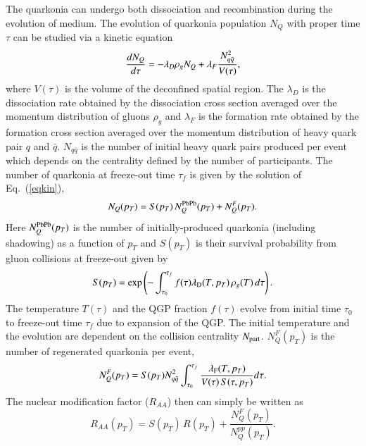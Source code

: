 {\color{black}
  The quarkonia can undergo both dissociation and recombination during the
  evolution of medium.
 The evolution of quarkonia population $N_{Q}$ with proper time $\tau$ can be studied via
a kinetic equation~\cite{Thews:2000rj}
  \begin{equation}\label{eqkin}
    {dN_{Q} \over d\tau}  =  - \lambda_D  \rho_g N_{Q} + \lambda_F {N_{q \bar{q}}^{2} \over V(\tau)},
  \end{equation}
  where $V(\tau)$ is the volume of the deconfined spatial region.
  The $\lambda_{D}$ is the dissociation rate obtained by the dissociation cross section
averaged over the momentum distribution of gluons $\rho_g$ and $\lambda_{F}$ is the formation
rate obtained by the formation cross section 
averaged over the momentum distribution of heavy quark pair $q$ and $\bar{q}$. 
$N_{q \bar{q}}$ is the number of initial heavy quark pairs produced per event which depends
on the centrality defined by the number of participants.
  The number of quarkonia at freeze-out time $\tau_f$ is given by the solution of Eq.~(\ref{eqkin}),
  \begin{equation}
    N_{Q}(p_T) = S(p_T) \,N_{Q}^{\rm PbPb}(p_T)+N_{Q}^F(p_T).
    \label{eqbeta}
  \end{equation}
  Here $N_{Q}^{\rm PbPb}(p_T)$ is the number of initially-produced quarkonia (including shadowing)
  as a function of $p_T$ and $S(p_T)$ is their survival probability from gluon collisions at
  freeze-out given by 
  \begin{equation}
    S(p_T) = \exp \left( {-\int_{\tau_0}^{\tau_f}f(\tau) \lambda_{\rm D}(T,p_T)\,\rho_g(T)\,d\tau} \right).
  \end{equation}
  The temperature $T(\tau)$ and the QGP fraction $f(\tau)$ evolve from initial time $\tau_0$ 
  to freeze-out time $\tau_f$ due to expansion of the QGP. The initial temperature and the 
  evolution are dependent on the collision centrality $N_{\rm part}$.
  $N_{Q}^F(p_T)$ is the number of regenerated quarkonia per event,
  \begin{equation}
    N_{Q}^F(p_T)=S(p_T)N_{q \bar{q}}^{2} \int_{\tau_0}^{\tau_f}{{\lambda_{\mathrm{F}}(T,p_T) \over V(\tau)\,S(\tau,p_T)} d\tau}.
  \end{equation}
  The nuclear modification factor ($R_{AA}$) then can simply be written as~\cite{Kumar:2014kfa, Kumar:2019xdj}
  \begin{equation}
    R_{AA}(p_T)=S(p_T) \, R(p_T) + \frac{N_{Q}^F(p_T)}{N_{Q}^{pp}(p_T)}.
    \label{raa}
  \end{equation}
}
